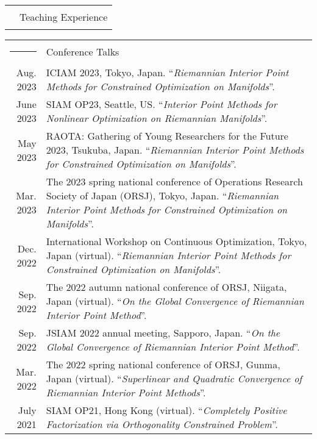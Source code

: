 \documentclass[letterpaper,10pt]{article}
\newcommand{\headingfont}{\LARGE }
\newenvironment{SectionTable}[1]{
	\renewcommand*{\arraystretch}{1.0}
	\setlength{\tabcolsep}{10pt}
	\begin{longtable}{Rp{5.2in}} 
		\rule{2.5cm}{4pt} 
		& #1 \\ %
	}
	{
	\end{longtable}\vspace{-.3cm}
}
\begin{document}
\begin{SectionTable}{\headingfont Teaching Experience}
%	 
%	 
%	 
\end{SectionTable}


\begin{SectionTable}{\headingfont Conference Talks}
	Aug. 2023 & ICIAM 2023, Tokyo, Japan. ``\textit{Riemannian Interior Point Methods for Constrained Optimization on Manifolds}''. \\
	
	June 2023 & SIAM OP23, Seattle, US.  
	``\textit{Interior Point Methods for Nonlinear Optimization on Riemannian Manifolds}''. \\
	
	May 2023 & RAOTA: Gathering of Young Researchers for the Future 2023, Tsukuba, Japan.  
	``\textit{Riemannian Interior Point Methods for Constrained Optimization on Manifolds}''. \\
	
	Mar. 2023 & The 2023 spring national conference of Operations Research Society of Japan (ORSJ), Tokyo, Japan.  
	``\textit{Riemannian Interior Point Methods for Constrained Optimization on Manifolds}''. \\
	
	Dec. 2022 & International Workshop on Continuous Optimization, Tokyo, Japan (virtual).  
	``\textit{Riemannian Interior Point Methods for Constrained Optimization on Manifolds}''. \\
	
	Sep. 2022 & The 2022 autumn national conference of ORSJ, Niigata, Japan (virtual). 
	``\textit{On the Global Convergence of Riemannian Interior Point Method}''.\\
	
	Sep. 2022 & JSIAM 2022 annual meeting, Sapporo, Japan. 
	``\textit{On the Global Convergence of Riemannian Interior Point Method}''.\\
	
	Mar. 2022 & The 2022 spring national conference of ORSJ, Gunma, Japan (virtual).
	``\textit{Superlinear and Quadratic Convergence of Riemannian Interior Point Methods}''. \\
	
	July 2021 & SIAM OP21, Hong Kong (virtual).  
	``\textit{Completely Positive Factorization via Orthogonality Constrained Problem}''. \\
	

\end{SectionTable}
\end{document}
